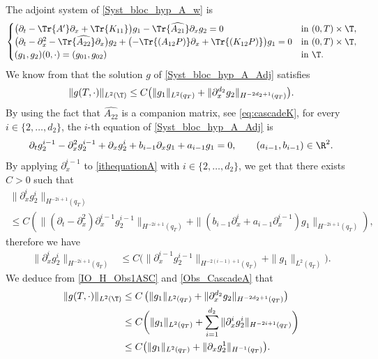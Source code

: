 The adjoint system of \eqref{Syst_bloc_hyp_A_w} is
\begin{equation} \label{Syst_bloc_hyp_A_Adj}
\begin{cases}
\bigl(\partial_t -\Tr{A'}\partial_x+\Tr{K_{11}}\bigr)g_1 - \Tr{\widehat{A_{21}}}\partial_x g_2= 0
&\text{in}\ (0,T)\times \T,\!\\
\bigl(\partial_t - \partial_x^2-\Tr{\widehat{A_{22}}}\partial_x\bigr)g_2 +\bigl(-\Tr{(A_{12}P)}\partial_x+\Tr{(K_{12}P)}\bigr)g_1 = 0 &\text{in}\ (0,T)\times \T,\!\\
(g_1,g_2)(0,\cdot)=(g_{01},g_{02}) & \text{in}\ \T.
\end{cases}
\end{equation}
\normalsize
We know from  that the solution $g$ of \eqref{Syst_bloc_hyp_A_Adj} satisfies
\begin{equation} \label{IO_H_Obs1ASC}
\| g(T,\cdot) \|_{L^2(\T)} \leq C \bigl(\| g_1\|_{L^2(q_T)} + \|\partial_{x}^{d_2} g_2\|_{H^{-2d_2+1}(q_T)} \bigr).
\end{equation}
By using the fact that $\widehat{A_{22}}$ is a companion matrix, see \eqref{eq:cascadeK}, for every $i \in \{2, \dots, d_2\}$, the $i$-th equation of \eqref{Syst_bloc_hyp_A_Adj} is
\begin{equation}
\partial_t g_2^{i-1} - \partial_x^2 g_2^{i-1} + \partial_{x} g_2^{i} + b_{i-1} \partial_x g_1+ a_{i-1} g_1 =0,\qquad (a_{i-1}, b_{i-1}) \in \R^2.
\label{ithequationA}
\end{equation}
By applying $\partial_{x}^{i-1}$ to \eqref{ithequationA} with $i \in \{2, \dots, d_2\}$, we get that there exists $C>0$ such that
\begin{multline*}
\|\partial_{x}^{i} g_2^{i}\|_{H^{-2i + 1 }(q_T)}\\
\leq C \left(\|(\partial_t - \partial_{x}^2)\partial_x^{i-1} g_2^{i-1}\|_{H^{-2i+1}(q_T)} + \| (b_{i-1} \partial_x^{i}+ a_{i-1}\partial_{x}^{i-1}) g_1\|_{H^{-2i+1}(q_T)} \right),
\end{multline*}
therefore we have
\begin{align}
\|\partial_{x}^{i} g_2^{i}\|_{H^{-2i + 1 }(q_T)} &\leq C \bigl(\|\partial_x^{i-1} g_2^{i-1}\|_{H^{-2(i-1)+1}(q_T)} + \| g_1\|_{L^2(q_T)} \bigr).
\label{Obs_CascadeA}
\end{align}
We deduce from \eqref{IO_H_Obs1ASC} and \eqref{Obs_CascadeA} that
\begin{equation}\label{IO_H_Obs2A}
\begin{split}
\| g(T,\cdot) \|_{L^2(\T)} & \leq C \left(\| g_1\|_{L^2(q_T)} + \|\partial_{x}^{d_2} g_2\|_{H^{-2d_2+1}(q_T)} \right)\\
& \leq C \biggl(\| g_1\|_{L^2(q_T)} + \sum_{i=1}^{d_2}\|\partial_{x}^{i} g_2^{i}\|_{H^{-2i + 1 }(q_T)} \biggr)\\
&\leq C \bigl(\| g_1\|_{L^2(q_T)} + \|\partial_{x} g_2^1\|_{H^{-1}(q_T)} \bigr).
\end{split}
\end{equation}
